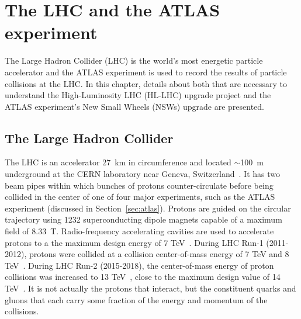 
\chapter{The LHC and the ATLAS experiment}
\label{chap:lhc_atlas}

The Large Hadron Collider (LHC) is the world's most energetic particle accelerator and the ATLAS experiment is used to record the results of particle collisions at the LHC. In this chapter, details about both that are necessary to understand the High-Luminosity LHC (HL-LHC) upgrade project and the ATLAS experiment's New Small Wheels (NSWs) upgrade are presented.

\section{The Large Hadron Collider}

The LHC is an accelerator \SI{27}{\kilo\meter} in circumference and located $\sim$\SI{100}{\meter} underground at the CERN laboratory near Geneva, Switzerland~\cite{evans_lhc_2008}. It has two beam pipes within which bunches of protons counter-circulate before being collided in the center of one of four major experiments, such as the ATLAS experiment (discussed in Section~\ref{sec:atlas}). Protons are guided on the circular trajectory using 1232 superconducting dipole magnets capable of a maximum field of \SI{8.33}{T}. Radio-frequency accelerating cavities are used to accelerate protons to a the maximum design energy of 7 TeV~\cite{bruning_lhc_2004}.  During LHC Run-1 (2011-2012), protons were collided at a collision center-of-mass energy of 7 TeV and 8 TeV~\cite{atlas_luminosity_run1}. During LHC Run-2 (2015-2018), the center-of-mass energy of proton collisions was increased to 13 TeV~\cite{atlas_luminosity_run2}, close to the maximum design value of 14 TeV~\cite{bruning_lhc_2004}. It is not actually the protons that interact, but the constituent quarks and gluons that each carry some fraction of the energy and momentum of the collisions.



